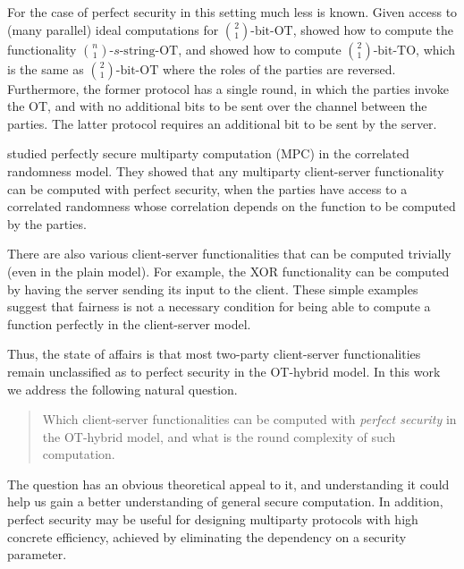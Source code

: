 \documentclass{llncs}
\newcommand{\bOT}[2]{\binom{#2}{#1}\text{-bit-OT}}
\newcommand{\TO}[2]{\binom{#2}{#1}\text{-bit-TO}}
\newcommand{\sOT}[3]{\binom{#2}{#1}\text{-}#3\text{-string-OT}}
\begin{document}
For the case of perfect security in this setting much less is known. Given access to (many parallel) ideal computations for $\bOT12$, \citet{BCS96} showed how to compute the functionality $\sOT{1}{n}{s}$, and \citet{WolfW06} showed how to compute $\TO{1}{2}$, which is the same as $\bOT{1}{2}$ where the roles of the parties are reversed. Furthermore, the former protocol has a single round, in which the parties invoke the OT, and with no additional bits to be sent over the channel between the parties. The latter protocol requires an additional bit to be sent by the server. 

\citet{IKMOP13} studied perfectly secure multiparty computation (MPC) in the correlated randomness model. They showed that any multiparty client-server functionality can be computed with perfect security, when the parties have access to a correlated randomness whose correlation depends on the function to be computed by the parties.

There are also various client-server functionalities that can be computed trivially (even in the plain model). For example, the XOR functionality can be computed by having the server sending its input to the client. These simple examples suggest that fairness is not a necessary condition for being able to compute a function perfectly in the client-server model.


Thus, the state of affairs is that most two-party client-server functionalities remain unclassified as to perfect security in the OT-hybrid model. In this work we address the following natural question.
\begin{quote}
Which client-server functionalities can be computed with \emph{perfect security} in the OT-hybrid model, and what is the round complexity of such computation.
\end{quote}
The question has an obvious theoretical appeal to it, and understanding it could help us gain a better understanding of general secure computation. In addition, perfect security may be useful for designing multiparty protocols with high concrete efficiency, achieved by eliminating the dependency on a security parameter.
\end{document}
